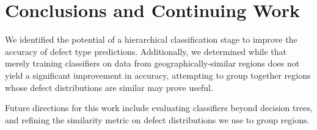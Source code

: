 \documentclass{sig-alternate-05-2015}
\begin{document}
\section{Conclusions and Continuing Work}
We identified the potential of a hierarchical classification stage to improve the accuracy of 
defect type predictions. Additionally, we determined while that merely training classifiers on 
data from geographically-similar regions does not yield a significant improvement in accuracy, 
attempting to group together regions whose defect distributions are similar may prove useful. 

Future directions for this work include evaluating classifiers beyond decision trees, and 
refining the similarity metric on defect distributions we use to group regions.




  
\end{document}
